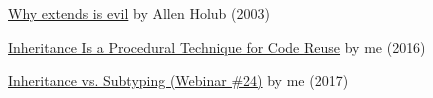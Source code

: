\documentclass{article}
\begin{document}



\href{https://www.infoworld.com/article/2073649/why-extends-is-evil.html}{Why extends is evil} by Allen Holub (2003)

\href{https://www.yegor256.com/2016/09/13/inheritance-is-procedural.html}{Inheritance Is a Procedural Technique for Code Reuse} by me (2016)

\href{https://www.youtube.com/watch?v=DjrA7_Uymok}{Inheritance vs. Subtyping (Webinar \#24)} by me (2017)
\end{document}
